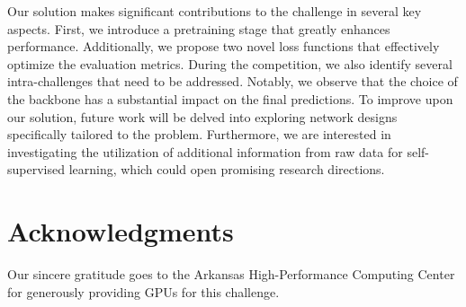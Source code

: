 \documentclass{article}
\begin{document}
Our solution makes significant contributions to the challenge in several key aspects. First, we introduce a pretraining stage that greatly enhances performance. Additionally, we propose two novel loss functions that effectively optimize the evaluation metrics. During the competition, we also identify several intra-challenges that need to be addressed. Notably, we observe that the choice of the backbone has a substantial impact on the final predictions. To improve upon our solution, future work will be delved into exploring network designs specifically tailored to the problem. Furthermore, we are interested in investigating the utilization of additional information from raw data for self-supervised learning, which could open promising research directions.

\section*{Acknowledgments}
Our sincere gratitude goes to the Arkansas High-Performance Computing Center for generously providing GPUs for this challenge.





\end{document}
